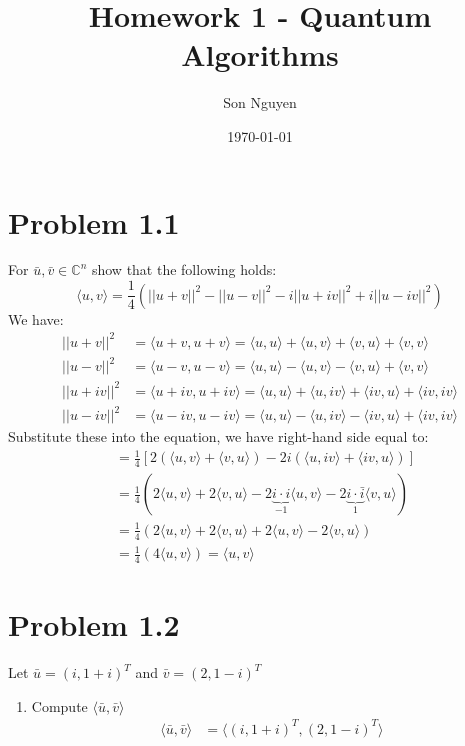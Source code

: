 \documentclass[12pt]{article}
\title{Homework 1 - Quantum Algorithms}
\author{Son Nguyen}
\date{\today}
\begin{document}
\maketitle

\section*{Problem 1.1}
For \(\bar{u}, \bar{v} \in \mathbb{C}^n\) show that the following holds:
\[ \langle u, v \rangle = \frac{1}{4}(||u+v||^2 - ||u-v||^2 - i||u+iv||^2 + i||u-iv||^2)\]
We have: 
\begin{align*}
    ||u+v||^2 &= \langle u+v, u+v \rangle = \langle u, u \rangle + \langle u, v \rangle + \langle v, u \rangle + \langle v, v \rangle \\
    ||u-v||^2 &= \langle u-v, u-v \rangle = \langle u, u \rangle - \langle u, v \rangle - \langle v, u \rangle + \langle v, v \rangle \\
    ||u+iv||^2 &= \langle u+iv, u+iv \rangle = \langle u, u \rangle + \langle u, iv \rangle + \langle iv, u \rangle + \langle iv, iv \rangle \\
    ||u-iv||^2 &= \langle u-iv, u-iv \rangle = \langle u, u \rangle - \langle u, iv \rangle - \langle iv, u \rangle + \langle iv, iv \rangle
\end{align*}
Substitute these into the equation, we have right-hand side equal to:
\begin{align*}
    &= \frac{1}{4} \left[2\left(\langle u, v \rangle + \langle v, u\rangle\right) - 2i \left(\langle u, iv\rangle + \langle iv, u\rangle\right)\right] \\
    &= \frac{1}{4} \left(2 \langle u, v \rangle + 2\langle v, u\rangle - 2\underbrace{i \cdot i}_{-1} \langle u, v\rangle - 2 \underbrace{i \cdot \bar{i}}_{1} \langle v, u\rangle\right) \\
    &= \frac{1}{4} \left(2 \langle u, v \rangle + 2\langle v, u\rangle + 2 \langle u, v\rangle - 2 \langle v, u\rangle\right) \\
    &= \frac{1}{4} \left(4 \langle u, v \rangle\right) = \langle u, v \rangle
\end{align*}
\section*{Problem 1.2}
Let \(\bar{u} = (i, 1+i)^T\) and \(\bar{v} = (2, 1-i)^T\)
\begin{enumerate}
    \item Compute \(\langle \bar{u}, \bar{v} \rangle\)
    \begin{align*}
        \langle \bar{u}, \bar{v} \rangle &= \langle (i, 1+i)^T, (2, 1-i)^T \rangle \\
    \end{align*}
\end{enumerate}
\end{document}
